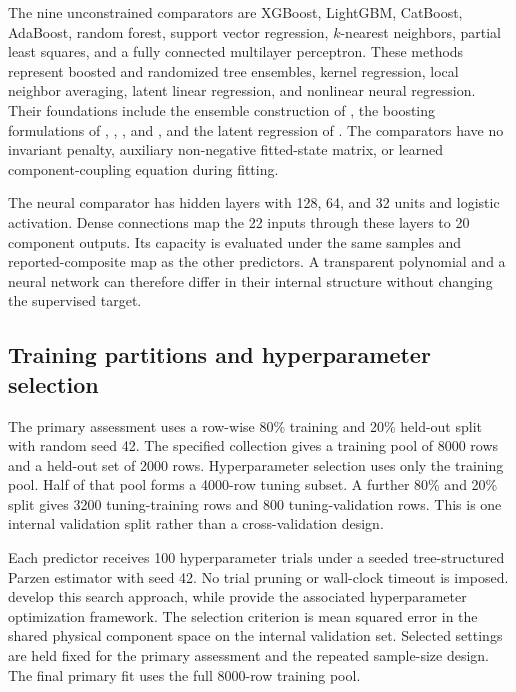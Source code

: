 The nine unconstrained comparators are XGBoost, LightGBM, CatBoost, AdaBoost, random forest, support vector regression, \(k\)-nearest neighbors, partial least squares, and a fully connected multilayer perceptron. These methods represent boosted and randomized tree ensembles, kernel regression, local neighbor averaging, latent linear regression, and nonlinear neural regression. Their foundations include the ensemble construction of \citet{Breiman2001}, the boosting formulations of \citet{Drucker1997}, \citet{ChenGuestrin2016}, \citet{Ke2017}, and \citet{Prokhorenkova2018}, and the latent regression of \citet{Wold2001}. The comparators have no invariant penalty, auxiliary non-negative fitted-state matrix, or learned component-coupling equation during fitting.

The neural comparator has hidden layers with 128, 64, and 32 units and logistic activation. Dense connections map the 22 inputs through these layers to 20 component outputs. Its capacity is evaluated under the same samples and reported-composite map as the other predictors. A transparent polynomial and a neural network can therefore differ in their internal structure without changing the supervised target.

\subsection{Training partitions and hyperparameter selection}

The primary assessment uses a row-wise 80\% training and 20\% held-out split with random seed 42. The specified collection gives a training pool of 8000 rows and a held-out set of 2000 rows. Hyperparameter selection uses only the training pool. Half of that pool forms a 4000-row tuning subset. A further 80\% and 20\% split gives 3200 tuning-training rows and 800 tuning-validation rows. This is one internal validation split rather than a cross-validation design.

Each predictor receives 100 hyperparameter trials under a seeded tree-structured Parzen estimator with seed 42. No trial pruning or wall-clock timeout is imposed. \citet{Bergstra2011} develop this search approach, while \citet{Akiba2019} provide the associated hyperparameter optimization framework. The selection criterion is mean squared error in the shared physical component space on the internal validation set. Selected settings are held fixed for the primary assessment and the repeated sample-size design. The final primary fit uses the full 8000-row training pool.

